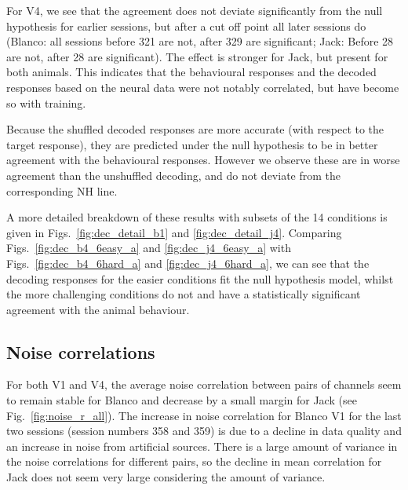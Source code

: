 For V4, we see that the agreement does not deviate significantly from the null hypothesis for earlier sessions, but after a cut off point all later sessions do (Blanco: all sessions before 321 are not, after 329 are significant; Jack: Before 28 are not, after 28 are significant). The effect is stronger for Jack, but present for both animals.
This indicates that the behavioural responses and the decoded responses based on the neural data were not notably correlated, but have become so with training.

Because the shuffled decoded responses are more accurate (with respect to the target response), they are predicted under the null hypothesis to be in better agreement with the behavioural responses. However we observe these are in worse agreement than the unshuffled decoding, and do not deviate from the corresponding NH line.

A more detailed breakdown of these results with subsets of the 14 conditions is given in Figs.~\ref{fig:dec_detail_b1} and \ref{fig:dec_detail_j4}.
Comparing Figs.~\ref{fig:dec_b4_6easy_a} and \ref{fig:dec_j4_6easy_a} with Figs.~\ref{fig:dec_b4_6hard_a} and \ref{fig:dec_j4_6hard_a}, we can see that the decoding responses for the easier conditions fit the null hypothesis model, whilst the more challenging conditions do not and have a statistically significant agreement with the animal behaviour.




\clearpage
\subsection{Noise correlations}

For both V1 and V4, the average noise correlation between pairs of channels seem to remain stable for Blanco and decrease by a small margin for Jack (see Fig.~\ref{fig:noise_r_all}). The increase in noise correlation for Blanco V1 for the last two sessions (session numbers 358 and 359) is due to a decline in data quality and an increase in noise from artificial sources. There is a large amount of variance in the noise correlations for different pairs, so the decline in mean correlation for Jack does not seem very large considering the amount of variance.



